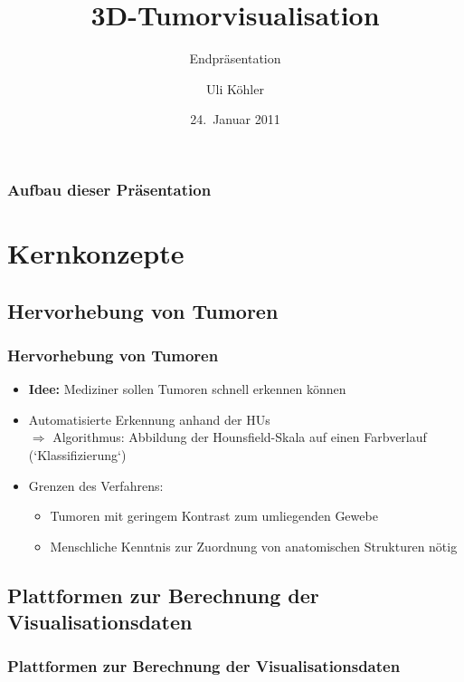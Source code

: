 \documentclass[14pt]{beamer}
\title{3D-Tumorvisualisation}
\subtitle{Endpräsentation}
\author{Uli Köhler}
\institute[EMG]{Ernst-Mach-Gymnasium Haar}
\date{24.~Januar 2011}
\begin{document}
\frame{\titlepage}
\begin{frame}
\frametitle{Aufbau dieser Präsentation}
\tableofcontents
\end{frame}
\section{Kernkonzepte}
\subsection{Hervorhebung von Tumoren}
\begin{frame}[allowframebreaks]
 \frametitle{Hervorhebung von Tumoren}
    \begin{itemize}
     \item \textbf{Idee:} Mediziner sollen Tumoren schnell erkennen können
     \item Automatisierte Erkennung anhand der HUs\\
	  $\Rightarrow$ Algorithmus: Abbildung der Hounsfield-Skala auf einen Farbverlauf (`Klassifizierung`)
     \item Grenzen des Verfahrens:
      \begin{itemize}
	\item Tumoren mit geringem Kontrast zum umliegenden Gewebe
	\item Menschliche Kenntnis zur Zuordnung von anatomischen Strukturen nötig
      \end{itemize}
    \end{itemize}
\end{frame}
\subsection{Plattformen zur Berechnung der Visualisationsdaten}
\begin{frame}
 \frametitle{Plattformen zur Berechnung der Visualisationsdaten}
\vspace{8mm}	
 \begin{center}
 \end{center}
\end{frame}

%
%
%
\end{document}
